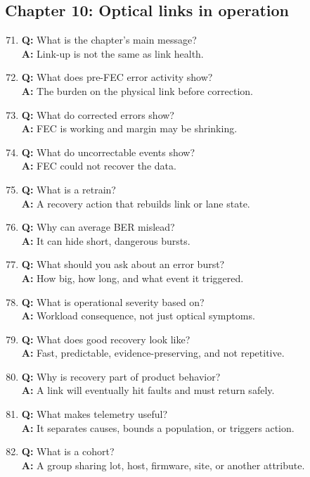 \subsection{Chapter 10: Optical links in operation}
\begin{enumerate}
\setcounter{enumi}{70}
\item \textbf{Q:} What is the chapter's main message?\\
\textbf{A:} Link-up is not the same as link health.
\item \textbf{Q:} What does pre-FEC error activity show?\\
\textbf{A:} The burden on the physical link before correction.
\item \textbf{Q:} What do corrected errors show?\\
\textbf{A:} FEC is working and margin may be shrinking.
\item \textbf{Q:} What do uncorrectable events show?\\
\textbf{A:} FEC could not recover the data.
\item \textbf{Q:} What is a retrain?\\
\textbf{A:} A recovery action that rebuilds link or lane state.
\item \textbf{Q:} Why can average BER mislead?\\
\textbf{A:} It can hide short, dangerous bursts.
\item \textbf{Q:} What should you ask about an error burst?\\
\textbf{A:} How big, how long, and what event it triggered.
\item \textbf{Q:} What is operational severity based on?\\
\textbf{A:} Workload consequence, not just optical symptoms.
\item \textbf{Q:} What does good recovery look like?\\
\textbf{A:} Fast, predictable, evidence-preserving, and not repetitive.
\item \textbf{Q:} Why is recovery part of product behavior?\\
\textbf{A:} A link will eventually hit faults and must return safely.
\item \textbf{Q:} What makes telemetry useful?\\
\textbf{A:} It separates causes, bounds a population, or triggers action.
\item \textbf{Q:} What is a cohort?\\
\textbf{A:} A group sharing lot, host, firmware, site, or another attribute.

\end{enumerate}
